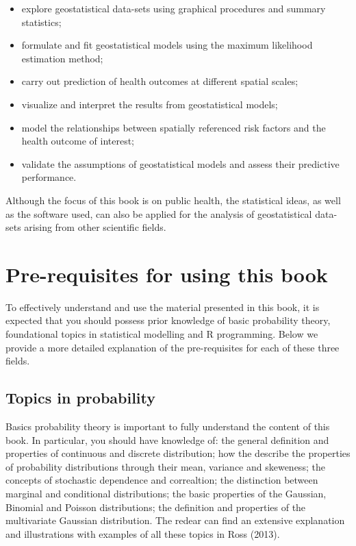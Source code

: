 \documentclass[
  letterpaper,
]{krantz}
\providecommand{\tightlist}{%
  \setlength{\itemsep}{0pt}\setlength{\parskip}{0pt}}\usepackage{longtable,booktabs,array}
\begin{document}
\begin{itemize}
\tightlist
\item
  explore geostatistical data-sets using graphical procedures and
  summary statistics;
\item
  formulate and fit geostatistical models using the maximum likelihood
  estimation method;
\item
  carry out prediction of health outcomes at different spatial scales;
\item
  visualize and interpret the results from geostatistical models;
\item
  model the relationships between spatially referenced risk factors and
  the health outcome of interest;
\item
  validate the assumptions of geostatistical models and assess their
  predictive performance.
\end{itemize}

Although the focus of this book is on public health, the statistical
ideas, as well as the software used, can also be applied for the
analysis of geostatistical data-sets arising from other scientific
fields.

\hypertarget{pre-requisites-for-using-this-book}{%
\section{Pre-requisites for using this
book}\label{pre-requisites-for-using-this-book}}

To effectively understand and use the material presented in this book,
it is expected that you should possess prior knowledge of basic
probability theory, foundational topics in statistical modelling and R
programming. Below we provide a more detailed explanation of the
pre-requisites for each of these three fields.

\hypertarget{topics-in-probability}{%
\subsection{Topics in probability}\label{topics-in-probability}}

Basics probability theory is important to fully understand the content
of this book. In particular, you should have knowledge of: the general
definition and properties of continuous and discrete distribution; how
the describe the properties of probability distributions through their
mean, variance and skeweness; the concepts of stochastic dependence and
correaltion; the distinction between marginal and conditional
distributions; the basic properties of the Gaussian, Binomial and
Poisson distributions; the definition and properties of the multivariate
Gaussian distribution. The redear can find an extensive explanation and
illustrations with examples of all these topics in Ross (2013).
\end{document}
